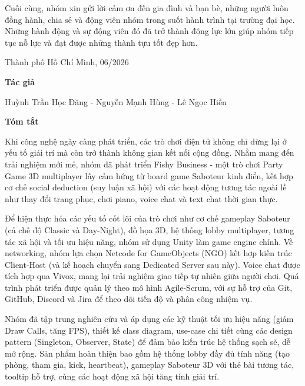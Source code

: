 \bigskip

Cuối cùng, nhóm xin gửi lời cảm ơn đến gia đình và bạn bè, những người luôn đồng hành, chia sẻ và động viên nhóm trong suốt hành trình tại trường đại học. Những hành động và sự động viên đó đã trở thành động lực lớn giúp nhóm tiếp tục nỗ lực và đạt được những thành tựu tốt đẹp hơn.

\vspace{2cm}

\begin{flushright}
Thành phố Hồ Chí Minh, 06/2026

\medskip

\textbf{Tác giả}

\medskip

Huỳnh Trần Học Đăng - Nguyễn Mạnh Hùng - Lê Ngọc Hiền
\end{flushright}

\newpage

\thispagestyle{empty}
{\Huge \bfseries {Tóm tắt}}
\vspace{1cm}

Khi công nghệ ngày càng phát triển, các trò chơi điện tử không chỉ dừng lại ở yếu tố giải trí mà còn trở thành không gian kết nối cộng đồng. Nhằm mang đến trải nghiệm mới mẻ, nhóm đã phát triển Fishy Business - một trò chơi Party Game 3D multiplayer lấy cảm hứng từ board game Saboteur kinh điển, kết hợp cơ chế social deduction (suy luận xã hội) với các hoạt động tương tác ngoài lề như thay đổi trang phục, chơi piano, voice chat và text chat thời gian thực.
\bigskip

Để hiện thực hóa các yếu tố cốt lõi của trò chơi như cơ chế gameplay Saboteur (cả chế độ Classic và Day-Night), đồ họa 3D, hệ thống lobby multiplayer, tương tác xã hội và tối ưu hiệu năng, nhóm sử dụng Unity làm game engine chính. Về networking, nhóm lựa chọn Netcode for GameObjects (NGO) kết hợp kiến trúc Client-Host (và kế hoạch chuyển sang Dedicated Server sau này). Voice chat được tích hợp qua Vivox, mang lại trải nghiệm giao tiếp tự nhiên giữa người chơi. Quá trình phát triển được quản lý theo mô hình Agile-Scrum, với sự hỗ trợ của Git, GitHub, Discord và Jira để theo dõi tiến độ và phân công nhiệm vụ.
\bigskip

Nhóm đã tập trung nghiên cứu và áp dụng các kỹ thuật tối ưu hiệu năng (giảm Draw Calls, tăng FPS), thiết kế class diagram, use-case chi tiết cùng các design pattern (Singleton, Observer, State) để đảm bảo kiến trúc hệ thống sạch sẽ, dễ mở rộng. Sản phẩm hoàn thiện bao gồm hệ thống lobby đầy đủ tính năng (tạo phòng, tham gia, kick, heartbeat), gameplay Saboteur 3D với thẻ bài tương tác, tooltip hỗ trợ, cùng các hoạt động xã hội tăng tính giải trí.
\bigskip


